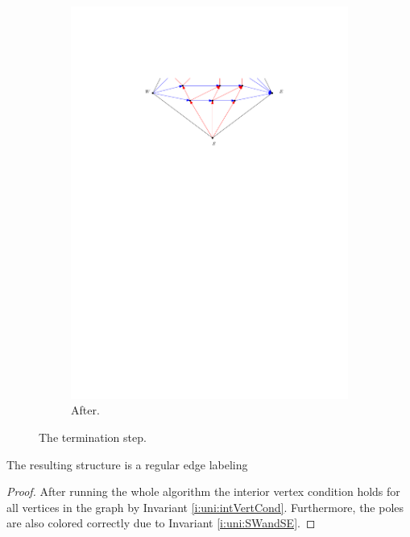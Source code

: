 \begin{figure}[h]
\begin{subfigure}[b]{0.45 \textwidth}
        \includegraphics[width =\textwidth]{unifiedAlgo/img/sweep/terminateAfter.pdf}
        \caption{After.}
    \end{subfigure}
    \caption{The termination step.}
    \label{fig:sweep:terminate}
  \end{figure}

  \begin{lemma}
    \label{lm:sweep:REL}
    The resulting structure is a regular edge labeling
  \end{lemma}

  \begin{proof}
    After running the whole algorithm the interior vertex condition holds for all vertices in the graph by Invariant \ref{i:uni:intVertCond}. Furthermore, the poles are also colored correctly due to Invariant \ref{i:uni:SWandSE}.
  \end{proof}

